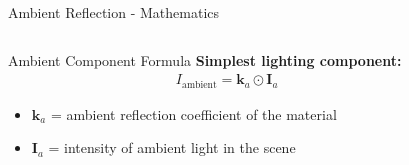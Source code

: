 \begin{frame}{Ambient Reflection - Mathematics}
  \begin{columns}
    \begin{column}{0.6\textwidth}
      \small
      \begin{mathbox}{Ambient Component Formula}
        \textbf{Simplest lighting component:}
        \begin{align*}
          I_{\text{ambient}} = \mathbf{k}_a \odot \mathbf{I}_a
        \end{align*}

        \begin{itemize}
          \item $\mathbf{k}_a$ = ambient reflection coefficient of the material
          \item $\mathbf{I}_a$ = intensity of ambient light in the scene
        \end{itemize}
      \end{mathbox}
    \end{column}
    \begin{column}{0.4\textwidth}
\end{column}
\end{columns}
\end{frame}
